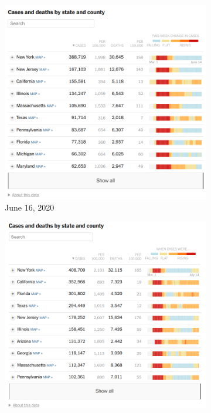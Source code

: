 \documentclass[article]{jdssv}\usepackage[]{graphicx}\usepackage[]{xcolor}
\begin{document}
\begin{figure}
\centering
\begin{subfigure}[t]{.25\textwidth}
\includegraphics[width=\textwidth]{nyt-wayback-20200616}
\caption{June 16, 2020}\label{fig:nyt-colors1}
\end{subfigure}\hfill
\begin{subfigure}[t]{.25\textwidth}
\includegraphics[width=\textwidth]{nyt-wayback-20200716}

\end{subfigure}
\end{figure}
\end{document}

